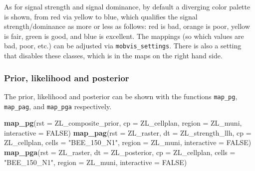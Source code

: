 \documentclass[
]{article}
\newenvironment{Shaded}{\begin{snugshade}}{\end{snugshade}}
\newcommand{\DataTypeTok}[1]{\textcolor[rgb]{0.13,0.29,0.53}{#1}}
\newcommand{\KeywordTok}[1]{\textcolor[rgb]{0.13,0.29,0.53}{\textbf{#1}}}
\newcommand{\NormalTok}[1]{#1}
\newcommand{\OtherTok}[1]{\textcolor[rgb]{0.56,0.35,0.01}{#1}}
\newcommand{\StringTok}[1]{\textcolor[rgb]{0.31,0.60,0.02}{#1}}
\begin{document}
As for signal strength and signal dominance, by default a diverging
color palette is shown, from red via yellow to blue, which qualifies the
signal strength/dominance as more or less as follows: red is bad, orange
is poor, yellow is fair, green is good, and blue is excellent. The
mappings (so which values are bad, poor, etc.) can be adjusted via
\texttt{mobvis\_settings}. There is also a setting that disables these
classes, which is in the maps on the right hand side.

\hypertarget{prior-likelihood-and-posterior}{%
\subsubsection{Prior, likelihood and
posterior}\label{prior-likelihood-and-posterior}}

The prior, likelihood and posterior can be shown with the functions
\texttt{map\_pg}, \texttt{map\_pag}, and \texttt{map\_pga} respectively.

\begin{Shaded}
\begin{Highlighting}[]
\KeywordTok{map_pg}\NormalTok{(}\DataTypeTok{rst =}\NormalTok{ ZL_composite_prior,}
       \DataTypeTok{cp =}\NormalTok{ ZL_cellplan,}
       \DataTypeTok{region =}\NormalTok{ ZL_muni,}
       \DataTypeTok{interactive =} \OtherTok{FALSE}\NormalTok{)}
\KeywordTok{map_pag}\NormalTok{(}\DataTypeTok{rst =}\NormalTok{ ZL_raster,}
        \DataTypeTok{dt =}\NormalTok{ ZL_strength_llh,}
        \DataTypeTok{cp =}\NormalTok{ ZL_cellplan,}
        \DataTypeTok{cells =} \StringTok{"BEE_150_N1"}\NormalTok{,}
        \DataTypeTok{region =}\NormalTok{ ZL_muni,}
        \DataTypeTok{interactive =} \OtherTok{FALSE}\NormalTok{)}
\KeywordTok{map_pga}\NormalTok{(}\DataTypeTok{rst =}\NormalTok{ ZL_raster,}
        \DataTypeTok{dt =}\NormalTok{ ZL_posterior,}
        \DataTypeTok{cp =}\NormalTok{ ZL_cellplan,}
        \DataTypeTok{cells =} \StringTok{"BEE_150_N1"}\NormalTok{,}
        \DataTypeTok{region =}\NormalTok{ ZL_muni,}
        \DataTypeTok{interactive =} \OtherTok{FALSE}\NormalTok{)}
\end{Highlighting}
\end{Shaded}
\end{document}
